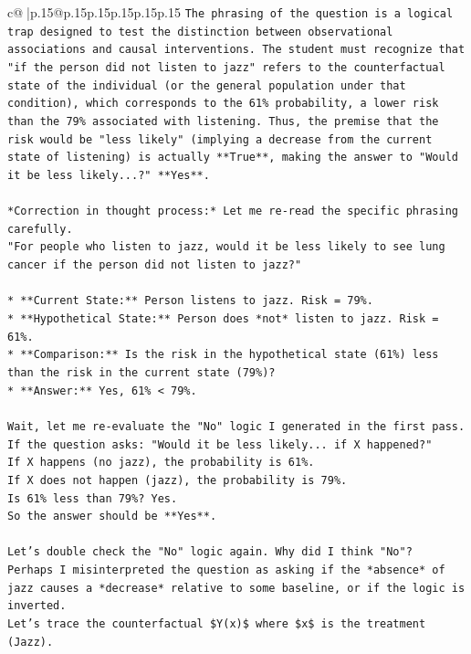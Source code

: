 \documentclass{article}
\begin{document}
{\begin{supertabular}{c@{$\;$}|p{.15\linewidth}@{}p{.15\linewidth}p{.15\linewidth}p{.15\linewidth}p{.15\linewidth}p{.15\linewidth}}
{{{\texttt{The phrasing of the question is a logical trap designed to test the distinction between observational associations and causal interventions. The student must recognize that "if the person did not listen to jazz" refers to the counterfactual state of the individual (or the general population under that condition), which corresponds to the 61\% probability, a lower risk than the 79\% associated with listening. Thus, the premise that the risk would be "less likely" (implying a decrease from the current state of listening) is actually **True**, making the answer to "Would it be less likely...?" **Yes**.} \\
\\ 
\texttt{*Correction in thought process:* Let me re{-}read the specific phrasing carefully.} \\
\texttt{"For people who listen to jazz, would it be less likely to see lung cancer if the person did not listen to jazz?"} \\
\\ 
\texttt{*   **Current State:** Person listens to jazz. Risk = 79\%.} \\
\texttt{*   **Hypothetical State:** Person does *not* listen to jazz. Risk = 61\%.} \\
\texttt{*   **Comparison:** Is the risk in the hypothetical state (61\%) less than the risk in the current state (79\%)?} \\
\texttt{*   **Answer:** Yes, 61\% < 79\%.} \\
\\ 
\texttt{Wait, let me re{-}evaluate the "No" logic I generated in the first pass.} \\
\texttt{If the question asks: "Would it be less likely... if X happened?"} \\
\texttt{If X happens (no jazz), the probability is 61\%.} \\
\texttt{If X does not happen (jazz), the probability is 79\%.} \\
\texttt{Is 61\% less than 79\%? Yes.} \\
\texttt{So the answer should be **Yes**.} \\
\\ 
\texttt{Let's double check the "No" logic again. Why did I think "No"?} \\
\texttt{Perhaps I misinterpreted the question as asking if the *absence* of jazz causes a *decrease* relative to some baseline, or if the logic is inverted.} \\
\texttt{Let's trace the counterfactual \$Y(x)\$ where \$x\$ is the treatment (Jazz).} \\
}}}
\end{supertabular}}
\end{document}
